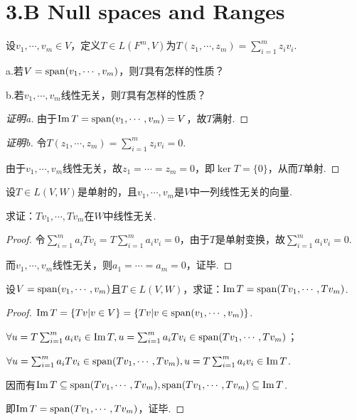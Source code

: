 \section{3.B Null spaces and Ranges}

\begin{problem}[3]\label{3.B.3}
    设\(v_1,\cdots,v_m \in V\)，定义\(T \in L(F^m,V)\)为\(T(z_1,\cdots,z_m)=\sum_{i=1}^m z_iv_i\).

    a.若\(V=\operatorname{span} (v_1,\cdots,v_m)\)，则\(T\)具有怎样的性质？

    b.若\(v_1,\cdots,v_m\)线性无关，则\(T\)具有怎样的性质？
\end{problem}

\begin{proof}[证明a]
    由于\(\operatorname{Im} T=\operatorname{span} (v_1,\cdots,v_m)=V\)，故\(T\)满射.
\end{proof}

\begin{proof}[证明b]
    令\(T(z_1,\cdots,z_m)=\sum_{i=1}^m z_iv_i=0\).

    由于\(v_1,\cdots,v_m\)线性无关，故\(z_1=\cdots=z_m=0\)，即\(\ker T=\{0\}\)，从而\(T\)单射.    
\end{proof}

\begin{problem}[9]\label{3.B.9}
    设\(T\in L(V,W)\)是单射的，且\(v_1,\cdots,v_m\)是\(V\)中一列线性无关的向量.

    求证：\(Tv_1,\cdots,Tv_m\)在\(W\)中线性无关.    
\end{problem}

\begin{proof}
    令\(\sum_{i=1}^m a_iTv_i=T\sum_{i=1}^m a_iv_i=0\)，由于\(T\)是单射变换，故\(\sum_{i=1}^m a_iv_i=0\).

    而\(v_1,\cdots,v_m\)线性无关，则\(a_1=\cdots=a_m=0\)，证毕.    
\end{proof}

\begin{problem}[10]\label{3.B.10}
    设\(V=\operatorname{span} (v_1,\cdots,v_m)\)且\(T\in L(V,W)\)，求证：\(\operatorname{Im} T=\operatorname{span} (Tv_1,\cdots,Tv_m)\).
\end{problem}

\begin{proof}
    \(\operatorname{Im} T=\{Tv|v\in V\}=\{Tv|v\in \operatorname{span}(v_1,\cdots,v_m)\}\).

    \(\forall u=T\sum_{i=1}^m a_iv_i \in \operatorname{Im} T,u=\sum_{i=1}^m a_iTv_i \in \operatorname{span}(Tv_1,\cdots,Tv_m)\)；

    \(\forall u=\sum_{i=1}^m a_iTv_i \in \operatorname{span}(Tv_1,\cdots,Tv_m),u=T\sum_{i=1}^m a_iv_i \in \operatorname{Im} T\).

    因而有\(\operatorname{Im} T \subseteq \operatorname{span}(Tv_1,\cdots,Tv_m),\operatorname{span}(Tv_1,\cdots,Tv_m) \subseteq \operatorname{Im} T\).

    即\(\operatorname{Im} T=\operatorname{span} (Tv_1,\cdots,Tv_m)\)，证毕.
\end{proof}

